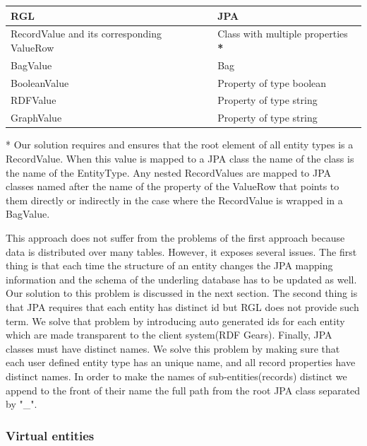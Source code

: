 \documentclass[a4paper, notitlepage]{article}
\begin{document}
\begin{center}
    \begin{tabular}{ | l | l |}
    \hline
    RGL & JPA  \\ \hline
    RecordValue and its corresponding ValueRow & Class with multiple properties \textbf{*}  \\ \hline
    BagValue & Bag  \\ \hline
    BooleanValue & Property of type boolean  \\ \hline
    RDFValue & Property of type string  \\ \hline
	GraphValue & Property of type string  \\ \hline
    \end{tabular}
\end{center}

* Our solution requires and ensures that the root element of all entity types is a RecordValue. When this value is mapped to a JPA class the name of the class is the name of the EntityType. Any nested RecordValues are mapped to JPA classes named after the name of the property of the ValueRow that points to them directly or indirectly in the case where the RecordValue is wrapped in a BagValue. 

This approach does not suffer from the problems of the first approach because data is distributed over many tables. However, it exposes several issues. The first thing is that each time the structure of an entity changes the JPA mapping information and the schema of the underling database has to be updated as well. Our solution to this problem is discussed in the next section. The second thing is that JPA requires that each entity has distinct id but RGL does not provide such term. We solve that problem by introducing auto generated ids for each entity which are made transparent to the client system(RDF Gears). Finally, JPA classes must have distinct names. We solve this problem by making sure that each user defined entity type has an unique name, and all record properties have distinct names. In order to make the names of sub-entities(records) distinct we append to the front of their name the full path from the root JPA class separated by "\_".


\subsubsection{Virtual entities}
\end{document}
